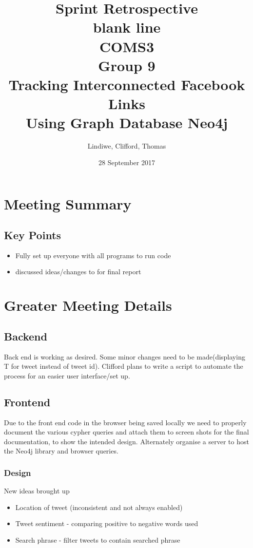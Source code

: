 \documentclass[11pt]{article}
\title{%
Sprint Retrospective\\\large
\color{white} blank line\\
\color{black}
COMS3\\
Group 9\\
Tracking Interconnected Facebook Links\\
Using Graph Database Neo4j}
\date{28 September 2017}
\author{Lindiwe, Clifford, Thomas}
\begin{document}
\maketitle
{}
\newpage
{}
\section{Meeting Summary}
\subsection{Key Points}
\begin{itemize}
\item Fully set up everyone with all programs to run code 
\item discussed ideas/changes to for final report
\end{itemize}

\section{Greater Meeting Details}
\subsection{Backend}
Back end is working as desired. Some minor changes need to be made(displaying T for tweet instead of tweet id).
Clifford plans to write a script to automate the process for an easier user interface/set up.

\subsection{Frontend}
Due to the front end code in the browser being saved locally we need to properly document the various cypher queries and attach them to screen shots for the final documentation, to show the intended design. 
Alternately organise a server to host the Neo4j library and browser queries.

\subsubsection{Design}
New ideas brought up
\begin{itemize}
\item Location of tweet (inconsistent and not always enabled)
\item Tweet sentiment - comparing positive to negative words used
\item Search phrase - filter tweets to contain searched phrase
\end{itemize}
\end{document}
